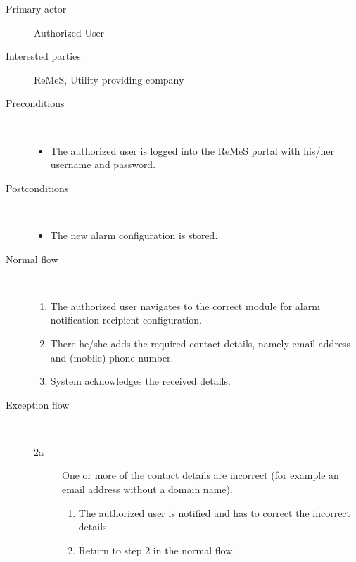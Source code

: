 \begin{description}
	\item[Primary actor] Authorized User
	\item[Interested parties] ReMeS, Utility providing company
	\item[Preconditions] \ 
	\begin{itemize}
		\item The authorized user is logged into the ReMeS portal with his/her
		username and password.
	\end{itemize}
	\item[Postconditions] \ 
	\begin{itemize}
		\item The new alarm configuration is stored.
	\end{itemize}
	\item[Normal flow] \ 
	\begin{enumerate}
	  	\item The authorized user navigates to the correct module for alarm
	  	notification recipient configuration.
	  	\item There he/she adds the required contact details, namely email address
	  	and (mobile) phone number.
	  	\item System acknowledges the received details.
	\end{enumerate}
	\item[Exception flow] \ 
	\begin{description}
		\item[2a] One or more of the contact details are incorrect (for example an
		email address without a domain name).
		\begin{enumerate}
		  \item The authorized user is notified and has to correct the incorrect
		  details.
		  \item Return to step 2 in the normal flow.
		\end{enumerate}
	\end{description}
\end{description}